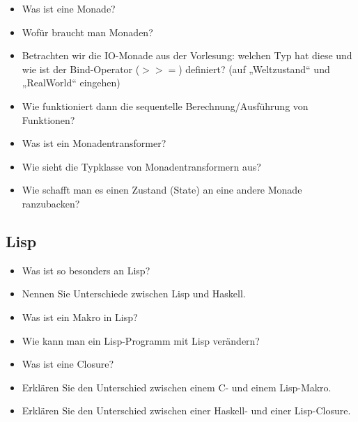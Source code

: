 \documentclass[
  a4paper,
  11pt,
]{article}
\newcommand{\gge}{>\!\!>\!\!=}
\begin{document}
\begin{itemize}
  \item Was ist eine Monade?
  \item Wofür braucht man Monaden?
  \item Betrachten wir die IO-Monade aus der Vorlesung: welchen Typ hat diese
    und wie ist der Bind-Operator ($\gge$) definiert? (auf „Weltzustand“
    und „RealWorld“ eingehen)
  \item Wie funktioniert dann die sequentelle Berechnung/Ausführung von
    Funktionen?
  \item Was ist ein Monadentransformer?
  \item Wie sieht die Typklasse von Monadentransformern aus?
  \item Wie schafft man es einen Zustand (State) an eine andere Monade
    ranzubacken?
\end{itemize}

\subsection*{Lisp}
\label{sub:Lisp}

\begin{itemize}
  \item Was ist so besonders an Lisp?
  \item Nennen Sie Unterschiede zwischen Lisp und Haskell.
  \item Was ist ein Makro in Lisp?
  \item Wie kann man ein Lisp-Programm mit Lisp verändern?
  \item Was ist eine Closure?
  \item Erklären Sie den Unterschied zwischen einem C- und einem Lisp-Makro.
  \item Erklären Sie den Unterschied zwischen einer Haskell- und einer
    Lisp-Closure.
\end{itemize}
\end{document}
